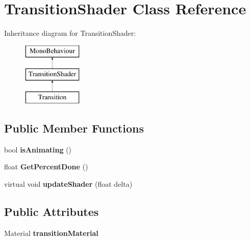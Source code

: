 \hypertarget{class_transition_shader}{\section{Transition\-Shader Class Reference}
\label{class_transition_shader}
}
Inheritance diagram for Transition\-Shader\-:\begin{figure}[H]
\begin{center}
\leavevmode
\includegraphics[height=3.000000cm]{class_transition_shader}
\end{center}
\end{figure}
\subsection*{Public Member Functions}
\begin{DoxyCompactItemize}
\item 
\hypertarget{class_transition_shader_ae8dedd089403a231910b379373df54c1}{bool {\bfseries is\-Animating} ()}\label{class_transition_shader_ae8dedd089403a231910b379373df54c1}

\item 
\hypertarget{class_transition_shader_a8cbeca073599504cadd53be59927442c}{float {\bfseries Get\-Percent\-Done} ()}\label{class_transition_shader_a8cbeca073599504cadd53be59927442c}

\item 
\hypertarget{class_transition_shader_ab6da38f951e0bc67a585a0a57db3148c}{virtual void {\bfseries update\-Shader} (float delta)}\label{class_transition_shader_ab6da38f951e0bc67a585a0a57db3148c}

\end{DoxyCompactItemize}
\subsection*{Public Attributes}
\begin{DoxyCompactItemize}
\item 
\hypertarget{class_transition_shader_a14516825ffc31067685fd7e998de92c5}{Material {\bfseries transition\-Material}}\label{class_transition_shader_a14516825ffc31067685fd7e998de92c5}

\end{DoxyCompactItemize}
